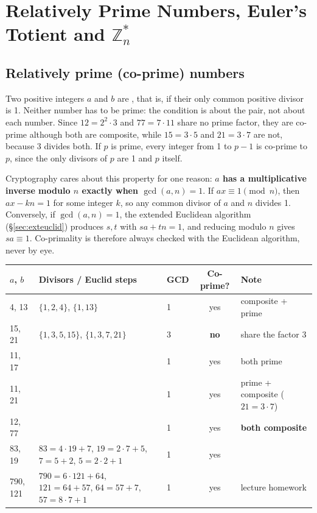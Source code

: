 \section{Relatively Prime Numbers, Euler's Totient and $\mathbb{Z}_n^*$}\label{sec:totient}

\subsection{Relatively prime (co-prime) numbers}
Two positive integers $a$ and $b$ are , that is, if their only common positive divisor is 1. Neither number has to be prime: the condition is about the pair, not about each number. Since $12 = 2^2 \cdot 3$ and $77 = 7 \cdot 11$ share no prime factor, they are co-prime although both are composite, while $15 = 3 \cdot 5$ and $21 = 3 \cdot 7$ are not, because 3 divides both. If $p$ is prime, every integer from 1 to $p - 1$ is co-prime to $p$, since the only divisors of $p$ are 1 and $p$ itself.

Cryptography cares about this property for one reason: \textbf{$a$ has a multiplicative inverse modulo $n$ exactly when $\gcd(a, n) = 1$}. If $ax \equiv 1 \pmod n$, then $ax - kn = 1$ for some integer $k$, so any common divisor of $a$ and $n$ divides 1. Conversely, if $\gcd(a, n) = 1$, the extended Euclidean algorithm (\S\ref{sec:exteuclid}) produces $s, t$ with $sa + tn = 1$, and reducing modulo $n$ gives $sa \equiv 1$. Co-primality is therefore always checked with the Euclidean algorithm, never by eye.
\begin{center}\small
\begin{tabular}{@{}lllcl@{}}
\toprule
$a$, $b$ & Divisors / Euclid steps & GCD & Co-prime? & Note\\
\midrule
4, 13 & $\{1,2,4\}$, $\{1,13\}$ & 1 & yes & composite + prime\\
15, 21 & $\{1,3,5,15\}$, $\{1,3,7,21\}$ & 3 & \textbf{no} & share the factor 3\\
11, 17 & & 1 & yes & both prime\\
11, 21 & & 1 & yes & prime + composite ($21 = 3\cdot7$)\\
12, 77 & & 1 & yes & \textbf{both composite}\\
83, 19 & $83 = 4\cdot19 + 7$, $19 = 2\cdot7 + 5$, $7 = 5 + 2$, $5 = 2\cdot2 + 1$ & 1 & yes & \\
790, 121 & $790 = 6\cdot121 + 64$, $121 = 64 + 57$, $64 = 57 + 7$, $57 = 8\cdot7 + 1$ & 1 & yes & lecture homework\\
\bottomrule
\end{tabular}
\end{center}

